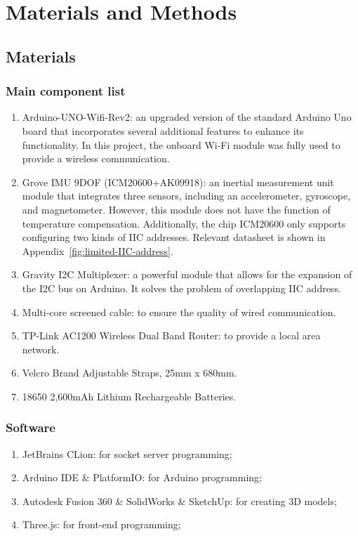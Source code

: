 \chapter{Materials and Methods}


\section{Materials}


\subsection{Main component list}
\begin{enumerate}
	\item   Arduino-UNO-Wifi-Rev2: an upgraded version of the standard Arduino Uno board that incorporates several additional features to enhance its functionality.
	In this project, the onboard Wi-Fi module was fully used to provide a wireless communication.
	\item   Grove IMU 9DOF (ICM20600+AK09918): an inertial measurement unit module that integrates three sensors, including an accelerometer, gyroscope, and magnetometer.
	However, this module does not have the function of temperature compensation.
	Additionally, the chip ICM20600 only supports configuring two kinds of IIC addresses.
	Relevant datasheet is shown in Appendix~\ref{fig:limited-IIC-address}.
	\item   Gravity I2C Multiplexer: a powerful module that allows for the expansion of the I2C bus on Arduino.
	It solves the problem of overlapping IIC address.
	\item   Multi-core screened cable: to ensure the quality of wired communication.
	\item   TP-Link AC1200 Wireless Dual Band Router: to provide a local area network.
	\item   Velcro Brand Adjustable Straps, 25mm x 680mm.
	\item   18650 2,600mAh Lithium Rechargeable Batteries.
\end{enumerate}

\subsection{Software}
\begin{enumerate}
    \item JetBrains CLion: for socket server programming;
    \item Arduino IDE \& PlatformIO: for Arduino programming;
    \item Autodesk Fusion 360 \& SolidWorks \& SketchUp: for creating 3D models;
    \item Three.js: for front-end programming;
\end{enumerate}


